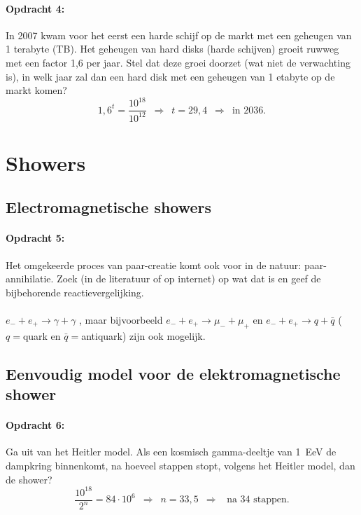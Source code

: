 \begin{minipage}[t]{1\columnwidth}
\paragraph{Opdracht 4:}
In 2007 kwam voor het eerst een harde schijf op de markt met een geheugen van 1 terabyte (TB). Het geheugen van hard disks (harde schijven) groeit ruwweg met een factor 1,6 per jaar. Stel dat deze groei doorzet (wat niet de verwachting is), in welk jaar zal dan een hard disk met een geheugen van 1 etabyte op de markt komen? 
\begin{equation}
1,6^t=\frac{10^{18}}{10^{12}} \, \, \,  \Rightarrow \, \, \, t=29,4 \,\,\, \Rightarrow \, \, \,  \textrm{in } 2036. \nonumber
\end{equation}
\end{minipage}


\section{Showers}

\subsection{Electromagnetische showers}

\begin{minipage}[t]{1\columnwidth}
\paragraph{Opdracht 5:}
Het omgekeerde proces van paar-creatie komt ook voor in de natuur: paar-annihilatie. Zoek (in de literatuur of op internet) op wat dat is en geef de bijbehorende reactievergelijking. 
\\ \\
$e_{-} + e_{+} \rightarrow \gamma + \gamma$ ,  maar bijvoorbeeld $e_{-} + e_{+} \rightarrow \mu_{-} + \mu_{+}$ en $e_{-} + e_{+} \rightarrow q + \bar{q}$ ($q=$quark en $\bar{q}=$antiquark) zijn ook mogelijk.
\end{minipage}


\subsection{Eenvoudig model voor de elektromagnetische shower}

\begin{minipage}[t]{1\columnwidth}
\paragraph{Opdracht 6:}
Ga uit van het Heitler model. Als een kosmisch gamma-deeltje van \SI{1}{\exa\electronvolt} de dampkring binnenkomt, na hoeveel stappen stopt, volgens het Heitler model, dan de shower? 
\begin{equation}
\frac{10^{18}}{2^n}=84 \cdot 10^6 \, \, \,  \Rightarrow \, \, \, n=33,5 \,\,\, \Rightarrow \, \, \, \textrm{  na  } 34 \textrm{ stappen}. \nonumber
\end{equation}
\end{minipage}


